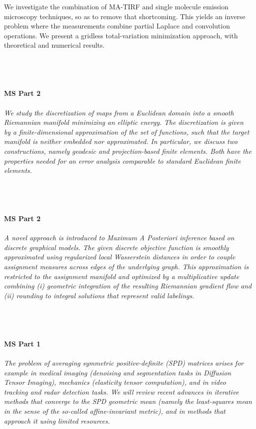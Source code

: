\begin{multicols}{2}
{We investigate the combination of MA-TIRF and single molecule emission microscopy techniques, so as to remove that shortcoming. This yields an inverse problem where the measurements combine partial Laplace and convolution operations. We present a gridless total-variation minimization approach, with theoretical and numerical results. }\\
\\ 
    \\
    \\\\
    \noindent\textbf{MS Part 2}\\
\\  
    \textit{We study the discretization of maps from a Euclidean domain into a smooth Riemannian manifold minimizing an elliptic energy. The discretization is given by a finite-dimensional approximation of the set of functions, such that the target manifold is neither embedded nor approximated. In particular, we discuss two constructions, namely geodesic and projection-based finite elements. Both have the properties needed for an error analysis comparable to standard Euclidean finite elements.}\\
\\ 
    \\
    \\\\
    \noindent\textbf{MS Part 2}\\
\\  
    \textit{A novel approach  is introduced to Maximum A Posteriori inference based on discrete graphical models. 
The given discrete objective function is smoothly approximated using regularized local Wasserstein distances in order
 to couple assignment measures across edges of the underlying graph. This approximation is restricted to the
 assignment manifold and optimized by a multiplicative update combining (i) geometric integration of the resulting Riemannian gradient flow and (ii) rounding to integral solutions that represent valid labelings.}\\
\\ 
    \\
    \\\\
    \noindent\textbf{MS Part 1}\\
\\  
    \textit{The problem of averaging symmetric positive-definite (SPD) matrices arises for example in medical imaging (denoising and segmentation tasks in Diffusion Tensor Imaging), mechanics (elasticity tensor computation), and in video tracking and radar detection tasks. We will review recent advances in iterative methods that converge to the SPD geometric mean (namely the least-squares mean in the sense of the so-called affine-invariant metric), and in methods that approach it using limited resources.}\\

\end{multicols}
